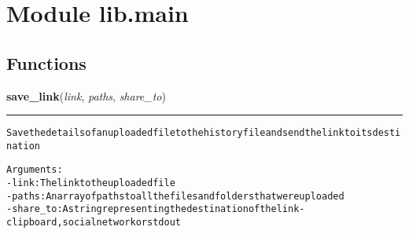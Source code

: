 %
%
%


\section{Module lib.main}

    \label{lib:main}


  \subsection{Functions}

    \label{lib:main:save_link}

    \vspace{0.5ex}

\hspace{.8\funcindent}\begin{boxedminipage}{\funcwidth}

    \raggedright \textbf{save\_link}(\textit{link}, \textit{paths}, \textit{share\_to})

    \vspace{-1.5ex}

    \rule{\textwidth}{0.5\fboxrule}
\setlength{\parskip}{2ex}
\begin{alltt}

Save the details of an uploaded file to the history file and send the link to its destination

Arguments:
- link: The link to the uploaded file
- paths: An array of paths to all the files and folders that were uploaded
- share\_to: A string representing the destination of the link - clipboard, social network or stdout
\end{alltt}

\setlength{\parskip}{1ex}
    \end{boxedminipage}

